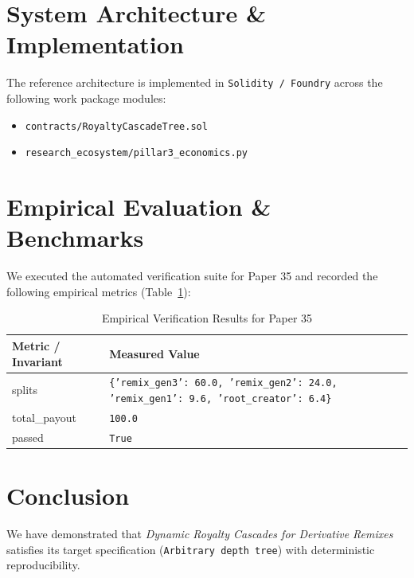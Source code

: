 \documentclass[10pt,twocolumn]{article}
\begin{document}
\section{System Architecture \& Implementation}
The reference architecture is implemented in \texttt{Solidity / Foundry} across the following work package modules:
\begin{itemize}
  \item \texttt{contracts/RoyaltyCascadeTree.sol}
  \item \texttt{research\_ecosystem/pillar3\_economics.py}
\end{itemize}

\section{Empirical Evaluation \& Benchmarks}
We executed the automated verification suite for Paper 35 and recorded the following empirical metrics (Table~\ref{tab:metrics}):

\begin{table}[htbp]
\centering
\caption{Empirical Verification Results for Paper 35}
\label{tab:metrics}
\begin{tabular}{ll}
\toprule
\textbf{Metric / Invariant} & \textbf{Measured Value} \\
\midrule
    splits & \texttt{\{'remix\_gen3': 60.0, 'remix\_gen2': 24.0, 'remix\_gen1': 9.6, 'root\_creator': 6.4\}} \\
    total\_payout & \texttt{100.0} \\
    passed & \texttt{True} \\
\bottomrule
\end{tabular}
\end{table}

\section{Conclusion}
We have demonstrated that \textit{Dynamic Royalty Cascades for Derivative Remixes} satisfies its target specification (\texttt{Arbitrary depth tree}) with deterministic reproducibility.



\end{document}

